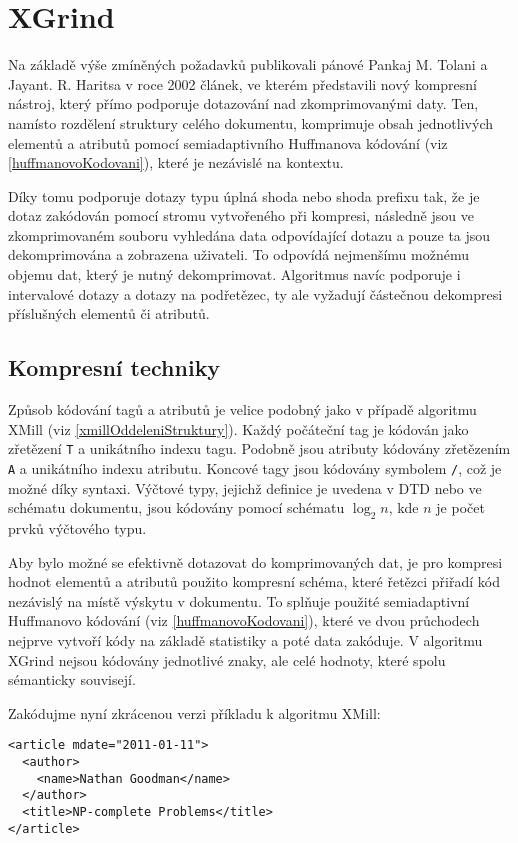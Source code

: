 \section{XGrind}
Na základě výše zmíněných požadavků publikovali pánové Pankaj M. Tolani a Jayant. R. Haritsa v roce 2002 článek, ve kterém představili nový kompresní nástroj, který přímo podporuje dotazování nad zkomprimovanými daty. Ten, namísto rozdělení struktury celého dokumentu, komprimuje obsah jednotlivých elementů a atributů pomocí semiadaptivního Huffmanova kódování (viz \ref{huffmanovoKodovani}), které je nezávislé na kontextu.

Díky tomu podporuje dotazy typu úplná shoda nebo shoda prefixu tak, že je dotaz zakódován pomocí stromu vytvořeného při kompresi, následně jsou ve zkomprimovaném souboru vyhledána data odpovídající dotazu a pouze ta jsou dekomprimována a zobrazena uživateli. To odpovídá nejmenšímu možnému objemu dat, který je nutný dekomprimovat. Algoritmus navíc podporuje i intervalové dotazy a dotazy na podřetězec, ty ale vyžadují částečnou dekompresi příslušných elementů či atributů.\cite{xgrind}

\subsection{Kompresní techniky}
\label{xgrindKompresniTechniky}
Způsob kódování tagů a atributů je velice podobný jako v případě algoritmu XMill (viz \ref{xmillOddeleniStruktury}). Každý počáteční tag je kódován jako zřetězení \texttt{T} a unikátního indexu tagu. Podobně jsou atributy kódovány zřetězením \texttt{A} a unikátního indexu atributu. Koncové tagy jsou kódovány symbolem \texttt{/}, což je možné díky syntaxi. Výčtové typy, jejichž definice je uvedena v DTD nebo ve schématu dokumentu, jsou kódovány pomocí schématu $\log_2n$, kde $n$ je počet prvků výčtového typu.

Aby bylo možné se efektivně dotazovat do komprimovaných dat, je pro kompresi hodnot elementů a atributů použito kompresní schéma, které řetězci přiřadí kód nezávislý na místě výskytu v dokumentu. To splňuje použité semiadaptivní Huffmanovo kódování (viz \ref{huffmanovoKodovani}), které ve dvou průchodech nejprve vytvoří kódy na základě statistiky a poté data zakóduje. V algoritmu XGrind nejsou kódovány jednotlivé znaky, ale celé hodnoty, které spolu sémanticky souvisejí.\cite{xgrind}

Zakódujme nyní zkrácenou verzi příkladu k algoritmu XMill:
\begin{verbatim}
<article mdate="2011-01-11">
  <author>
    <name>Nathan Goodman</name>
  </author>
  <title>NP-complete Problems</title>
</article>
\end{verbatim}

